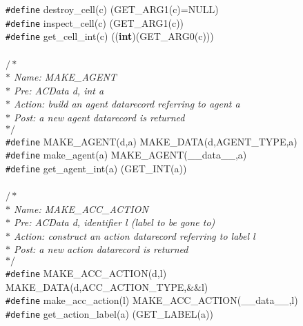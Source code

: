 \begin{flushleft}
{\tt \#define} destroy\_cell(c) (GET\_ARG1(c)=NULL)\mbox{}\\
{\tt \#define} inspect\_cell(c) (GET\_ARG1(c))\mbox{}\\
{\tt \#define} get\_cell\_int(c) (({\bf int})(GET\_ARG0(c)))\mbox{}\\
\mbox{}\\
{$/\ast$\it{}\mbox{}\\
\hspace*{1\indentation}$\ast$ Name: MAKE\_AGENT\mbox{}\\
\hspace*{1\indentation}$\ast$ Pre: ACData d, int a\mbox{}\\
\hspace*{1\indentation}$\ast$ Action: build an agent datarecord referring to agent a\mbox{}\\
\hspace*{1\indentation}$\ast$ Post: a new agent datarecord is returned\mbox{}\\
\hspace*{1\indentation}$\ast/$}\mbox{}\\
{\tt \#define} MAKE\_AGENT(d,a) MAKE\_DATA(d,AGENT\_TYPE,a)\mbox{}\\
{\tt \#define} make\_agent(a) MAKE\_AGENT(\_\_data\_\_,a)\mbox{}\\
{\tt \#define} get\_agent\_int(a) (GET\_INT(a))\mbox{}\\
\mbox{}\\
{$/\ast$\it{}\mbox{}\\
\hspace*{1\indentation}$\ast$ Name: MAKE\_ACC\_ACTION\mbox{}\\
\hspace*{1\indentation}$\ast$ Pre: ACData d, identifier l (label to be gone to)\mbox{}\\
\hspace*{1\indentation}$\ast$ Action: construct an action datarecord referring to label l\mbox{}\\
\hspace*{1\indentation}$\ast$ Post: a new action datarecord is returned\mbox{}\\
\hspace*{1\indentation}$\ast/$}\mbox{}\\
{\tt \#define} MAKE\_ACC\_ACTION(d,l) MAKE\_DATA(d,ACC\_ACTION\_TYPE,\&\&l)\mbox{}\\
{\tt \#define} make\_acc\_action(l) MAKE\_ACC\_ACTION(\_\_data\_\_,l)\mbox{}\\
{\tt \#define} get\_action\_label(a) (GET\_LABEL(a))\mbox{}\\

\end{flushleft}
